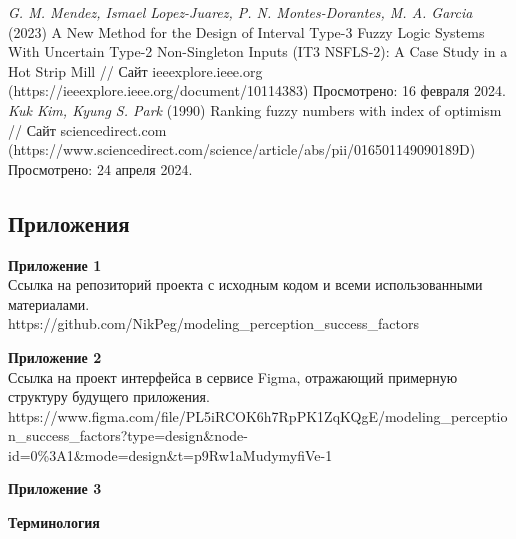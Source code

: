 \documentclass{article}
\newcommand\zz[1]{\par{\normalsize\strut #1} \hfill\ignorespaces}
\begin{document}
\begin{thebibliography}{}
         \textit{G. M. Mendez, Ismael Lopez-Juarez, P. N. Montes-Dorantes, M. A. Garcia} (2023) A New Method for the Design of Interval Type-3 Fuzzy Logic Systems With Uncertain Type-2 Non-Singleton Inputs (IT3 NSFLS-2): A Case Study in a Hot Strip Mill // Сайт ieeexplore.ieee.org (https://ieeexplore.ieee.org/document/10114383) Просмотрено: 16 февраля 2024.
         \textit{Kuk Kim, Kyung S. Park} (1990) Ranking fuzzy numbers with index of optimism // Сайт sciencedirect.com (https://www.sciencedirect.com/science/article/abs/pii/016501149090189D) Просмотрено: 24 апреля 2024.

    \end{thebibliography}
    \newpage
    \begin{center}
        \section*{Приложения}
    \end{center}
    \zz{}\textbf{Приложение 1\\}
    Ссылка на репозиторий проекта с исходным кодом и всеми использованными материалами.\\
    https://github.com/NikPeg/modeling\_perception\_success\_factors\\
    \zz{}\textbf{Приложение 2\\}
    Ссылка на проект интерфейса в сервисе Figma, отражающий примерную структуру будущего приложения.\\
    https://www.figma.com/file/PL5iRCOK6h7RpPK1ZqKQgE/modeling\_perception\_success\_factors?type=design\&node-id=0\%3A1\&mode=design\&t=p9Rw1aMudymyfiVe-1\\
    \zz{}\textbf{Приложение 3\\}
    \zz{}\textbf{Терминология\\}
\end{document}
